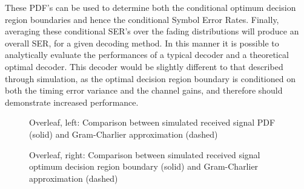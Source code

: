 These PDF's can be used to determine both the conditional optimum decision region boundaries and hence the conditional Symbol Error Rates. Finally, averaging these conditional SER's over the fading distributions will produce an overall SER, for a given decoding method. In this manner it is possible to analytically evaluate the performances of a typical decoder and a theoretical optimal decoder. This decoder would be slightly different to that described through simulation, as the optimal decision region boundary is conditioned on both the timing error variance and the channel gains, and therefore should demonstrate increased performance.

\begin{figure}[htbp]
\caption[Received signal PDF: Gram-Charlier approximation vs simulation]{Overleaf, left: Comparison between simulated received signal PDF (solid) and Gram-Charlier approximation (dashed)}
\end{figure}

{
\setlength{\floatsep}{2pt plus 1.0pt minus 2.0pt}
\setlength{\textfloatsep}{2pt plus 1.0pt minus 2.0pt}
\setlength{\intextsep}{2pt plus 1.0pt minus 2.0pt}
\begin{figure}[htbp]
\caption[Received signal optimum DRB: Gram-Charlier approximation vs simulation]{Overleaf, right: Comparison between simulated received signal optimum decision region boundary (solid) and Gram-Charlier approximation (dashed)}
\end{figure}
}

